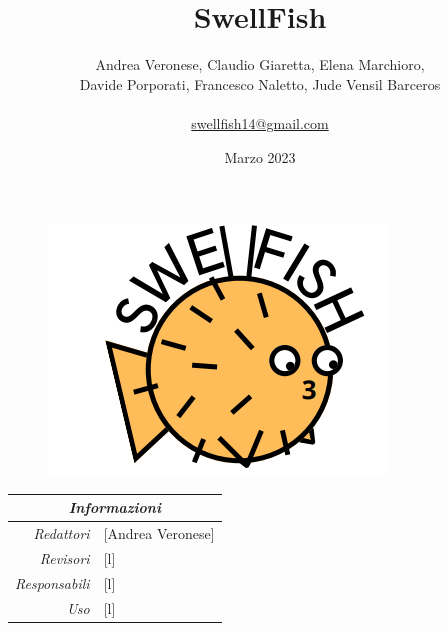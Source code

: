 \documentclass[12pt]{article}
\begin{document}
\title{SwellFish}
\begin{figure}
\centering
\includegraphics[scale=0.5]{Swellfish_logo.png}
\end{figure}
\author{Andrea Veronese, Claudio Giaretta, Elena Marchioro,\\
Davide Porporati, Francesco Naletto, Jude Vensil Barceros \\ \\
 \href{swellfish14@gmail.com}{swellfish14@gmail.com} \\
} 
\date{Marzo 2023}



\maketitle
\begin{center}
    \begin{tabular}{r | l}
		\multicolumn{2}{c}{\textit{Informazioni}}\\
		\hline
		
			\textit{Redattori} &
			[Andrea Veronese]\makecell{}\\
		
			\textit{Revisori} &
			[l]\makecell{}\\
			\textit{Responsabili} &
			[l]\makecell{}\\
		      \textit{Uso} & 
                [l]\makecell{}\\
\end{tabular}
\end{center}


\tableofcontents
\printindex 
\end{document}

